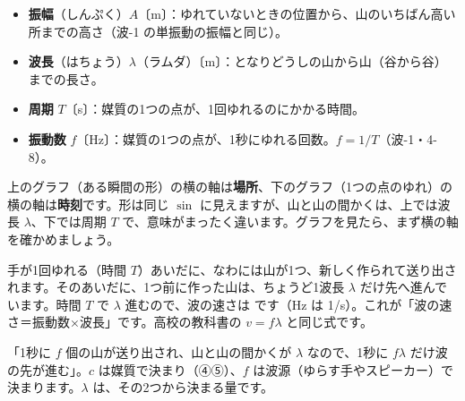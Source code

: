 \begin{itemize}[label={\color{bkTheme}●}, leftmargin=1.6\zw, itemsep=1pt, topsep=2pt]
\item \textbf{振幅}（しんぷく）$A$〔m〕：ゆれていないときの位置から、山のいちばん高い所までの高さ（波-1 の単振動の振幅と同じ）。
\item \textbf{波長}（はちょう）$\lambda$（ラムダ）〔m〕：となりどうしの山から山（谷から谷）までの長さ。
\item \textbf{周期} $T$〔s〕：媒質の1つの点が、1回ゆれるのにかかる時間。
\item \textbf{振動数} $f$〔Hz〕：媒質の1つの点が、1秒にゆれる回数。$f=1/T$（波-1・4-8）。
\end{itemize}
上のグラフ（ある瞬間の形）の横の軸は\textbf{場所}、下のグラフ（1つの点のゆれ）の横の軸は\textbf{時刻}です。形は同じ $\sin$ に見えますが、山と山の間かくは、上では波長 $\lambda$、下では周期 $T$ で、意味がまったく違います。グラフを見たら、まず横の軸を確かめましょう。

手が1回ゆれる（時間 $T$）あいだに、なわには山が1つ、新しく作られて送り出されます。そのあいだに、1つ前に作った山は、ちょうど1波長 $\lambda$ だけ先へ進んでいます。時間 $T$ で $\lambda$ 進むので、波の速さは
\label{ph:波-5:flambda}です（Hz は 1/s）。これが「波の速さ＝振動数×波長」です。高校の教科書の $v=f\lambda$ と同じ式です。

\begin{phyomi}[$c=f\lambda$]
「1秒に $f$ 個の山が送り出され、山と山の間かくが $\lambda$ なので、1秒に $f\lambda$ だけ波の先が進む」。$c$ は媒質で決まり（④⑤）、$f$ は波源（ゆらす手やスピーカー）で決まります。$\lambda$ は、その2つから決まる量です。
\end{phyomi}

